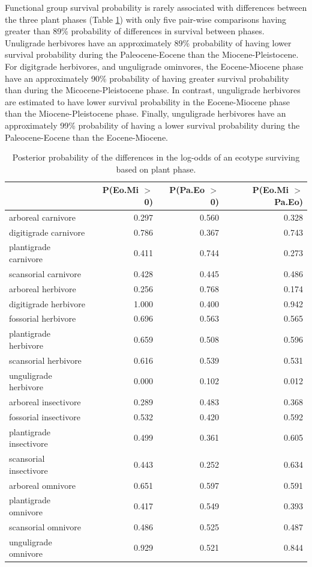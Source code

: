\documentclass[12pt,letterpaper]{article}
\begin{document}
Functional group survival probability is rarely associated with differences between the three plant phases (Table \ref{tab:surv_plant}) with only five pair-wise comparisons having greater than 89\% probability of differences in survival between phases. Unuligrade herbivores have an approximately 89\% probability of having lower survival probability during the Paleocene-Eocene than the Miocene-Pleistocene. For digitgrade herbivores, and unguligrade ominvores, the Eocene-Miocene phase have an approximately 90\% probability of having greater survival probability than during the Micocene-Pleistocene phase. In contrast, unguligrade herbivores are estimated to have lower survival probability in the Eocene-Miocene phase than the Miocene-Pleistocene phase. Finally, unguligrade herbivores have an approximately 99\% probability of having a lower survival probability during the Paleocene-Eocene than the Eocene-Miocene.
\begin{table}[ht]
  \centering
  \caption[Posterior probablity estimates of differences in survival by plant phase]{Posterior probability of the differences in the log-odds of an ecotype surviving based on plant phase.} 
  \label{tab:surv_plant}
  \begin{tabular}{ l r r r }
    \hline
    & P(Eo.Mi $>$ 0) & P(Pa.Eo $>$ 0) & P(Eo.Mi $>$ Pa.Eo) \\ 
    \hline
    arboreal carnivore & 0.297 & 0.560 & 0.328 \\ 
    digitigrade carnivore & 0.786 & 0.367 & 0.743 \\ 
    plantigrade carnivore & 0.411 & 0.744 & 0.273 \\ 
    scansorial carnivore & 0.428 & 0.445 & 0.486 \\ 
    arboreal herbivore & 0.256 & 0.768 & 0.174 \\ 
    digitigrade herbivore & 1.000 & 0.400 & 0.942 \\ 
    fossorial herbivore & 0.696 & 0.563 & 0.565 \\ 
    plantigrade herbivore & 0.659 & 0.508 & 0.596 \\ 
    scansorial herbivore & 0.616 & 0.539 & 0.531 \\ 
    unguligrade herbivore & 0.000 & 0.102 & 0.012 \\ 
    arboreal insectivore & 0.289 & 0.483 & 0.368 \\ 
    fossorial insectivore & 0.532 & 0.420 & 0.592 \\ 
    plantigrade insectivore & 0.499 & 0.361 & 0.605 \\ 
    scansorial insectivore & 0.443 & 0.252 & 0.634 \\ 
    arboreal omnivore & 0.651 & 0.597 & 0.591 \\ 
    plantigrade omnivore & 0.417 & 0.549 & 0.393 \\ 
    scansorial omnivore & 0.486 & 0.525 & 0.487 \\ 
    unguligrade omnivore & 0.929 & 0.521 & 0.844 \\ 
    \hline
  \end{tabular}
\end{table}
\end{document}
